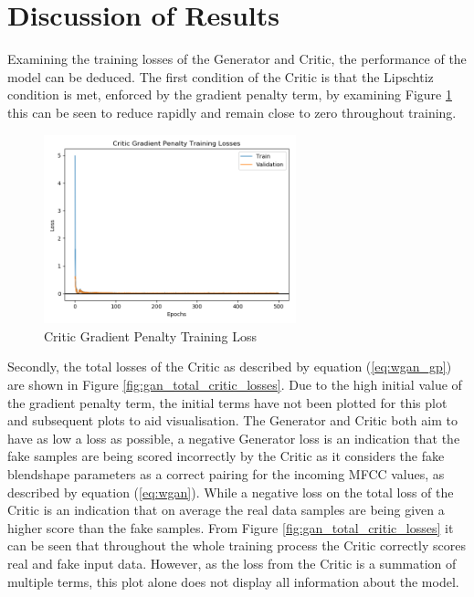 \section{Discussion of Results}
Examining the training losses of the Generator and Critic, the performance of the model can be deduced.
The first condition of the Critic is that the Lipschtiz condition is met, enforced by the gradient penalty term, by examining Figure \ref{fig:gan_critic_gp} this can be seen to reduce rapidly and remain close to zero throughout training.

\begin{figure}[h!]
    \centering
        \includegraphics[width=0.65\textwidth]{figures/gan/critic_gp_train_losses.png}
    \caption{Critic Gradient Penalty Training Loss}\label{fig:gan_critic_gp}
\end{figure} 

Secondly, the total losses of the Critic as described by equation (\ref{eq:wgan_gp}) are shown in Figure \ref{fig:gan_total_critic_losses}.
Due to the high initial value of the gradient penalty term, the initial terms have not been plotted for this plot and subsequent plots to aid visualisation.
The Generator and Critic both aim to have as low a loss as possible, a negative Generator loss is an indication that the fake samples are being scored incorrectly by the Critic as it considers the fake blendshape parameters as a correct pairing for the incoming MFCC values, as described by equation (\ref{eq:wgan}).
While a negative loss on the total loss of the Critic is an indication that on average the real data samples are being given a higher score than the fake samples.
From Figure \ref{fig:gan_total_critic_losses} it can be seen that throughout the whole training process the Critic correctly scores real and fake input data.
However, as the loss from the Critic is a summation of multiple terms, this plot alone does not display all information about the model.

